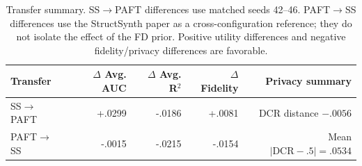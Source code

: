 \begin{table}[t]
\centering
\small
\begin{tabular}{lrrrr}
\toprule
Transfer & $\Delta$ Avg. AUC & $\Delta$ Avg. R$^2$ & $\Delta$ Fidelity & Privacy summary \\
\midrule
SS$\to$PAFT & +.0299 & -.0186 & +.0081 & DCR distance $-.0056$ \\
PAFT$\to$SS & -.0015 & -.0215 & -.0154 & Mean $|\mathrm{DCR}-.5|=.0534$ \\
\bottomrule
\end{tabular}
\caption{Transfer summary. SS$\to$PAFT differences use matched seeds 42--46.
PAFT$\to$SS differences use the StructSynth paper as a cross-configuration reference;
they do not isolate the effect of the FD prior. Positive utility differences and
negative fidelity/privacy differences are favorable.}
\label{tab:cross-transfer-summary}
\end{table}
